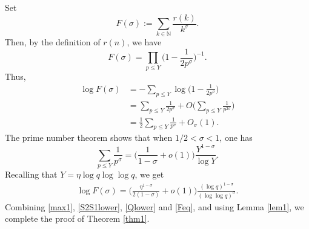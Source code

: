 \documentclass[12pt,reqno]{amsart}
\theoremstyle{definition}
\numberwithin{equation}{section}
\newcommand{\Bg}{\Big}
\newcommand{\mbn}{\mathbb{N}}
\begin{document}
\par
Set 
\[
F(\sigma) := \sum_{k \in \mbn} \frac{r(k)}{k^\sigma}.
\]
Then, by the definition of $r(n)$, we have
\[
F(\sigma)=\prod_{p\leq Y}\Bg(1-\frac{1}{2p^\sigma}\Bg)^{-1}.
\] 
Thus, 
\begin{align*}
    		\log F(\sigma)&=-\sum_{p\leq Y}\log\Bg(1-\frac{1}{2p^\sigma}\Bg)
		\\&=\sum_{p\leq Y}\frac{1}{2p^\sigma}+O\Bg(\sum_{p\leq Y}\frac{1}{p^{2\sigma}}\Bg)
		\\&=\frac 12\sum_{p\leq Y}\frac{1}{p^\sigma}+O_\sigma(1).
\end{align*}
The prime number theorem shows that when \(1/2<\sigma<1\), one has
\[
\sum_{p \le Y} \frac{1}{p^\sigma}= \Bg(\frac{1}{1-\sigma}+o(1)\Bg) \frac{Y^{1-\sigma}}{\log Y}.
\]
Recalling that \(Y= \eta \log q \log\log q\), we get
\begin{align}
    \label{Feq}
    \log F(\sigma) = \Bg(\frac{\eta^{1-\sigma}}{2(1-\sigma)}+o(1)\Bg)  \frac{(\log q)^{1-\sigma}}{(\log\log q)^{\sigma}}.
\end{align}
Combining \eqref{max1}, \eqref{S2S1lower}, \eqref{Qlower} and \eqref{Feq}, and using Lemma \ref{lem1}, we complete the proof of Theorem \ref{thm1}.































	
    
\end{document}
